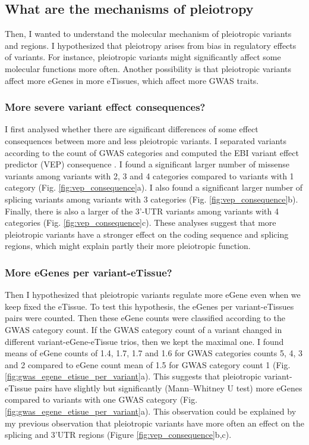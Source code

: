 \subsection*{What are the mechanisms of pleiotropy}

Then, I wanted to understand the molecular mechanism of pleiotropic variants and regions.
%
I hypothesized that pleiotropy arises from bias in regulatory effects of variants.
%
For instance, pleiotropic variants might significantly affect some molecular functions more often.
%
Another possibility is that pleiotropic variants affect more eGenes in more eTissues, which affect more GWAS traits.

\subsubsection*{More severe variant effect consequences?}

I first analysed whether there are significant differences of some effect consequences between more and less pleiotropic variants.
%
I separated variants according to the count of GWAS categories and computed the EBI variant effect predictor (VEP) consequence \citep{2016.Cunningham.McLaren}.
%
I found a significant larger number of missense variants among variants with 2, 3 and 4 categories compared to variants with 1 category (Fig. \ref{fig:vep_consequence}a).
%
I also found a significant larger number of splicing variants among variants with 3 categories (Fig. \ref{fig:vep_consequence}b).
%
Finally, there is also a larger of the 3'-UTR variants among variants with 4 categories (Fig. \ref{fig:vep_consequence}c).
%
These analyses suggest that more pleiotropic variants have a stronger effect on the coding sequence and splicing regions, which might explain partly their more pleiotropic function.

\subsubsection*{More eGenes per variant-eTissue?}

Then I hypothesized that pleiotropic variants regulate more eGene even when we keep fixed the eTissue.
%
To test this hypothesis, the eGenes per variant-eTissues pairs were counted.
%
Then these eGene counts were classified according to the GWAS category count.
%
If the GWAS category count of a variant changed in different variant-eGene-eTissue trios, then we kept the maximal one.
%
I found means of eGene counts of 1.4, 1.7, 1.7 and 1.6 for GWAS categories counts 5, 4, 3 and 2 compared to eGene count mean of 1.5 for GWAS category count 1 (Fig. \ref{fig:gwas_egene_etisue_per_variant}a).
%
This suggests that pleiotropic variant-eTissue pairs have slightly but significantly (Mann–Whitney U test) more eGenes compared to variants with one GWAS category (Fig. \ref{fig:gwas_egene_etisue_per_variant}a).
%
This observation could be explained by my previous observation that pleiotropic variants have more often an effect on the splicing and 3'UTR regions (Figure \ref{fig:vep_consequence}b,c).

